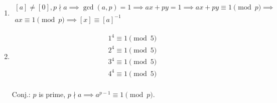 \documentclass[12pt]{article}
\begin{document}
\begin{enumerate}
        which is a contradiction since we've established previously that $b \not\equiv 0 \pmod{n}$, therefore $\mathbb{Z}/n\mathbb{Z}$ is not a field.
  \item
        \[
        \begin{gathered}
          [a] \neq [0], p \nmid a \implies \gcd(a, p) = 1 \implies ax + py = 1 \implies ax + py \equiv 1 \pmod{p} \implies \\
          ax \equiv 1 \pmod{p} \implies [x] \equiv {[a]}^{-1}
        \end{gathered}
        \]
  \item
        \[
        \begin{gathered}
          1^{4} \equiv 1 \pmod{5} \\
          2^{4} \equiv 1 \pmod{5} \\
          3^{4} \equiv 1 \pmod{5} \\
          4^{4} \equiv 1 \pmod{5} \\
        \end{gathered}
        \]

        Conj.: $p$ is prime, $p \nmid a \implies a^{p-1} \equiv 1 \pmod{p}$.
\end{enumerate}
\end{document}
